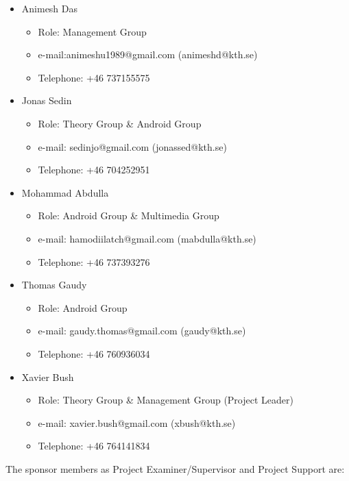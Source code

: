 \documentclass[11pt,a4paper,english]{book}  %
\theoremstyle{definition}  %
\theoremstyle{plain}  %
\theoremstyle{remark}  %
\begin{document}
\begin{itemize}

\item Animesh Das
	\begin{itemize}
	\item Role: Management Group
	\item e-mail:animeshu1989@gmail.com (animeshd@kth.se)
	\item Telephone: +46 737155575
	\end{itemize}
	
\item Jonas Sedin
	\begin{itemize}
	\item Role: Theory Group \& Android Group
	\item e-mail: sedinjo@gmail.com (jonassed@kth.se)
	\item Telephone: +46 704252951
	\end{itemize}
	
\item Mohammad Abdulla
	\begin{itemize}
	\item Role: Android Group \& Multimedia Group
	\item e-mail: hamodiilatch@gmail.com (mabdulla@kth.se)
	\item Telephone: +46 737393276
	\end{itemize}
	
\item Thomas Gaudy
	\begin{itemize}
	\item Role: Android Group
	\item e-mail: gaudy.thomas@gmail.com (gaudy@kth.se)
	\item Telephone: +46 760936034
	\end{itemize}
	
\item Xavier Bush
	\begin{itemize}
	\item Role: Theory Group \& Management Group (Project Leader)
	\item e-mail: xavier.bush@gmail.com (xbush@kth.se)
	\item Telephone: +46 764141834
	\end{itemize}
	
	
\end{itemize}

The sponsor members as Project Examiner/Supervisor and Project Support are:
\end{document}
